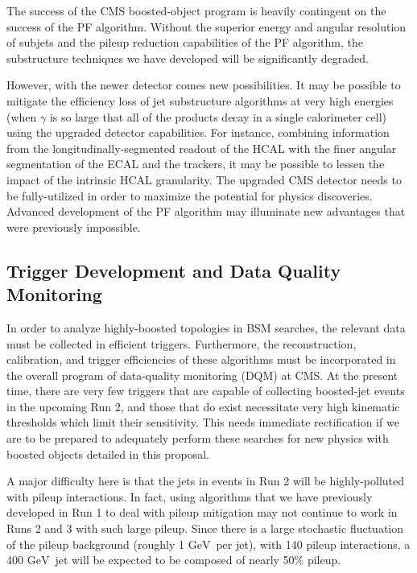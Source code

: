 \documentclass[12pt]{proposalnsf}
\newcommand{\GeVc}{\ensuremath{\mathrm{GeV}}}
\begin{document}
The success of the CMS boosted-object program is heavily
contingent on the success of the PF algorithm. Without the superior
energy and angular resolution of subjets and the pileup
reduction capabilities of the PF algorithm, the substructure
techniques we have developed will be significantly degraded.

However, with the newer detector comes new possibilities. It may be
possible to mitigate the efficiency loss of jet substructure
algorithms at very high energies (when $\gamma$ is so large that all of
the products decay in a single calorimeter cell) using the upgraded
detector capabilities. For instance, combining information from the
longitudinally-segmented
readout of the HCAL with the finer angular segmentation of the ECAL
and the trackers,
it may be possible to lessen the impact of the intrinsic
HCAL granularity. 
The upgraded CMS detector needs to be fully-utilized in order to
maximize the potential for physics discoveries. Advanced development
of the PF algorithm may illuminate new advantages that were
previously impossible.

\subsection{Trigger Development and Data Quality Monitoring}

In order to analyze highly-boosted topologies in BSM searches, 
the relevant data must be collected in efficient triggers. Furthermore, the
reconstruction, calibration, and trigger efficiencies of these
algorithms must be incorporated in the overall program of 
data-quality monitoring (DQM) at CMS. At the present time, there are
very few triggers that are capable of collecting boosted-jet
events in the upcoming Run 2, and those that do exist necessitate very
high kinematic thresholds which limit their sensitivity. This needs
immediate rectification if we are to be prepared to adequately perform
these searches for new physics with boosted objects detailed in this
proposal. 

A major difficulty here is that the jets in events in
Run 2 will be highly-polluted with pileup interactions. 
In fact, using algorithms that we have previously developed in Run 1
to deal with pileup mitigation may not continue to work in Runs 2 and
3 with
such large pileup. Since there is a large stochastic fluctuation of
the pileup background (roughly 1 \GeVc\ per jet), with 140 pileup
interactions, a 400 \GeVc\ jet will be expected to be composed of
nearly 50\% pileup. 
\end{document}
